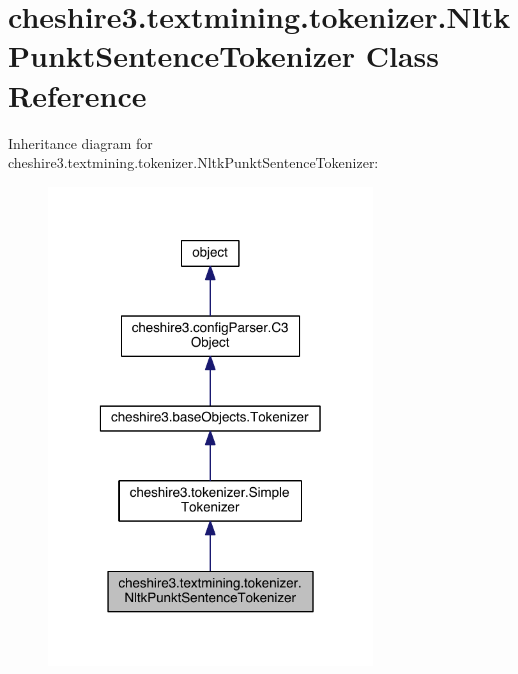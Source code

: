 \hypertarget{classcheshire3_1_1textmining_1_1tokenizer_1_1_nltk_punkt_sentence_tokenizer}{\section{cheshire3.\-textmining.\-tokenizer.\-Nltk\-Punkt\-Sentence\-Tokenizer Class Reference}
\label{classcheshire3_1_1textmining_1_1tokenizer_1_1_nltk_punkt_sentence_tokenizer}
}


Inheritance diagram for cheshire3.\-textmining.\-tokenizer.\-Nltk\-Punkt\-Sentence\-Tokenizer\-:
\nopagebreak
\begin{figure}[H]
\begin{center}
\leavevmode
\includegraphics[width=244pt]{classcheshire3_1_1textmining_1_1tokenizer_1_1_nltk_punkt_sentence_tokenizer__inherit__graph}
\end{center}
\end{figure}


